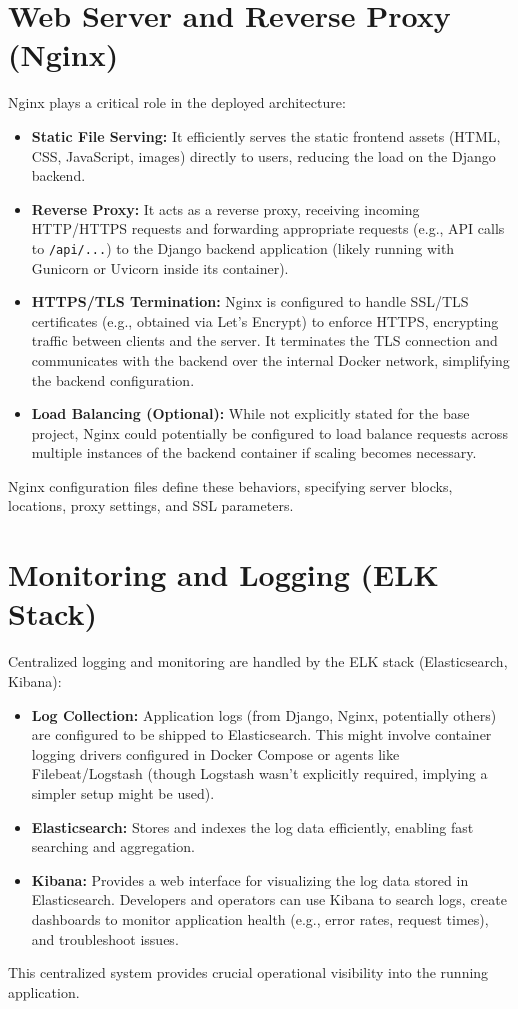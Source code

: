 \section{Web Server and Reverse Proxy (Nginx)}
\label{sec:nginx_config}
Nginx plays a critical role in the deployed architecture:
\begin{itemize}
    \item \textbf{Static File Serving:} It efficiently serves the static frontend assets (HTML, CSS, JavaScript, images) directly to users, reducing the load on the Django backend.
    \item \textbf{Reverse Proxy:} It acts as a reverse proxy, receiving incoming HTTP/HTTPS requests and forwarding appropriate requests (e.g., API calls to \texttt{/api/...}) to the Django backend application (likely running with Gunicorn or Uvicorn inside its container).
    \item \textbf{HTTPS/TLS Termination:} Nginx is configured to handle SSL/TLS certificates (e.g., obtained via Let's Encrypt) to enforce HTTPS, encrypting traffic between clients and the server. It terminates the TLS connection and communicates with the backend over the internal Docker network, simplifying the backend configuration.
    \item \textbf{Load Balancing (Optional):} While not explicitly stated for the base project, Nginx could potentially be configured to load balance requests across multiple instances of the backend container if scaling becomes necessary.
\end{itemize}
Nginx configuration files define these behaviors, specifying server blocks, locations, proxy settings, and SSL parameters.

\section{Monitoring and Logging (ELK Stack)}
\label{sec:elk_monitoring}
Centralized logging and monitoring are handled by the ELK stack (Elasticsearch, Kibana):
\begin{itemize}
    \item \textbf{Log Collection:} Application logs (from Django, Nginx, potentially others) are configured to be shipped to Elasticsearch. This might involve container logging drivers configured in Docker Compose or agents like Filebeat/Logstash (though Logstash wasn't explicitly required, implying a simpler setup might be used).
    \item \textbf{Elasticsearch:} Stores and indexes the log data efficiently, enabling fast searching and aggregation.
    \item \textbf{Kibana:} Provides a web interface for visualizing the log data stored in Elasticsearch. Developers and operators can use Kibana to search logs, create dashboards to monitor application health (e.g., error rates, request times), and troubleshoot issues.
\end{itemize}
This centralized system provides crucial operational visibility into the running application.

